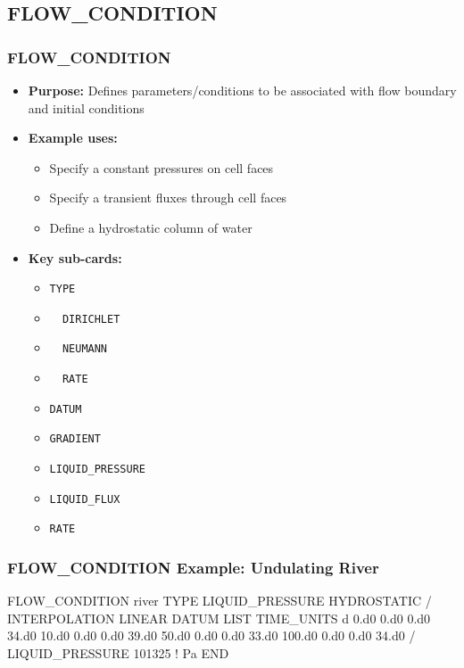 \subsection{FLOW\_CONDITION}

\begin{frame}\frametitle{FLOW\_CONDITION}

\begin{itemize}
\item[] \textbf{Purpose:} Defines parameters/conditions to be associated with flow boundary and initial conditions
\item[] \textbf{Example uses:}
\begin{itemize}
  \item Specify a constant pressures on cell faces
  \item Specify a transient fluxes through cell faces
  \item Define a hydrostatic column of water
\end{itemize}
\item[] \textbf{Key sub-cards:}
\begin{itemize}
  \item[] \verb|TYPE|
  \item[] \verb|  DIRICHLET|
  \item[] \verb|  NEUMANN|
  \item[] \verb|  RATE|
  \item[] \verb|DATUM|
  \item[] \verb|GRADIENT|
  \item[] \verb|LIQUID_PRESSURE|
  \item[] \verb|LIQUID_FLUX|
  \item[] \verb|RATE|
\end{itemize}
\end{itemize}

\end{frame}

\begin{frame}[fragile]\frametitle{FLOW\_CONDITION Example: Undulating River}

\begin{semiverbatim}
FLOW_CONDITION river
  TYPE
    LIQUID_PRESSURE HYDROSTATIC
  /
  INTERPOLATION LINEAR
  DATUM LIST
    TIME_UNITS d
    0.d0 0.d0 0.d0 34.d0
    10.d0 0.d0 0.d0 39.d0
    50.d0 0.d0 0.d0 33.d0
    100.d0 0.d0 0.d0 34.d0
  /
  LIQUID_PRESSURE 101325 ! Pa
END
\end{semiverbatim}

\end{frame}

